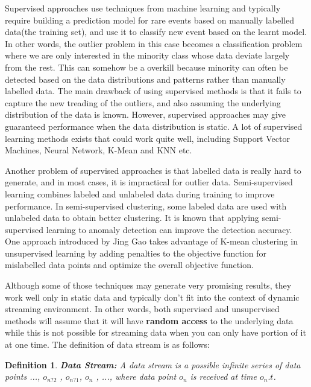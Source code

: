 \documentclass[11pt]{article}       %
\newtheorem{definition}{Definition}
\begin{document}
Supervised approaches use techniques from machine learning and typically require building a prediction model for rare events based on manually labelled data(the training set), and use it to classify new event based on the learnt model\cite{Joshi:2001:MNH:376284.375673,sup02}. In other words, the outlier problem in this case becomes a classification problem where we are only interested in the minority class whose data deviate largely from the rest. This can somehow be a overkill because minority can often be detected based on the data distributions and patterns rather than manually labelled data. The main drawback of using supervised methods is that it fails to capture the new treading of the outliers, and also assuming the underlying distribution of the data is known. However, supervised approaches may give guaranteed performance when the data distribution is static. A lot of supervised learning methods exists that could work quite well, including Support Vector Machines, Neural Network, K-Mean and KNN etc. 

Another problem of supervised approaches is that labelled data is really hard to generate, and in most cases, it is impractical for outlier data. Semi-supervised learning\cite{Basu:2004:PFS:1014052.1014062,semi-sup02} combines labeled and unlabeled data during training to improve performance. In semi-supervised clustering, some labeled data are used with unlabeled data to obtain better clustering. It is known that applying semi-supervised learning to anomaly detection can improve the detection accuracy\cite{Yu2009}. One approach introduced by Jing Gao\cite{Gao:2006:SOD:1141277.1141421} takes advantage of K-mean clustering in unsupervised learning by adding penalties to the objective function for mislabelled data points and optimize the overall objective function. 

Although some of those techniques may generate very promising results, they work well only in static data and typically don't fit into the context of dynamic streaming environment. In other words, both supervised and unsupervised methods will assume that it will have \textbf{random access} to the underlying data while this is not possible for streaming data when you can only have portion of it at one time. The definition of data stream is as follows:

\begin{definition}
\textbf{Data Stream:} A data stream is a possible infinite series of data points ..., $o_{n?2}$ , $o_{n?1}$, $o_{n}$ , ..., where data point $o_{n}$ is received at time $o_{n}.t$.
\end{definition}
\end{document}
